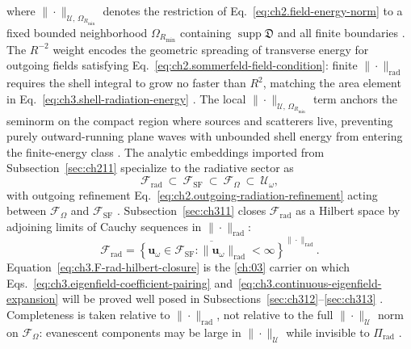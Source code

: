 where \(\|\cdot\|_{\mathcal{U},\,\Omega_{R_{\min}}}\) denotes the restriction of
Eq.~\eqref{eq:ch2.field-energy-norm} to a fixed bounded neighborhood \(\Omega_{R_{\min}}\) containing
\(\operatorname{supp}\mathfrak{D}\) and all finite boundaries \cite{stratton1941}. The
\(R^{-2}\) weight encodes the geometric spreading of transverse energy for outgoing fields satisfying
Eq.~\eqref{eq:ch2.sommerfeld-field-condition}: finite \(\|\cdot\|_{\mathrm{rad}}\) requires the shell
integral to grow no faster than \(R^{2}\), matching the area element in
Eq.~\eqref{eq:ch3.shell-radiation-energy} \cite{stratton1941}. The local
\(\|\cdot\|_{\mathcal{U},\,\Omega_{R_{\min}}}\) term anchors the seminorm on the compact region where
sources and scatterers live, preventing purely outward-running plane waves with unbounded shell energy
from entering the finite-energy class \cite{stratton1941}.
The analytic embeddings imported from Subsection~\ref{sec:ch211} specialize to the radiative sector as
\begin{equation}
\label{eq:ch3.radiative-subspace-chain}
\mathcal{F}_{\mathrm{rad}}
\ \subset\
\mathcal{F}_{\mathrm{SF}}
\ \subset\
\mathcal{F}_\Omega
\ \subset\
\mathcal{U}_\omega,
\end{equation}
with outgoing refinement Eq.~\eqref{eq:ch2.outgoing-radiation-refinement} acting between
\(\mathcal{F}_\Omega\) and \(\mathcal{F}_{\mathrm{SF}}\) \cite{stratton1941}. Subsection~\ref{sec:ch311}
closes \(\mathcal{F}_{\mathrm{rad}}\) as a Hilbert space by adjoining limits of Cauchy sequences in
\(\|\cdot\|_{\mathrm{rad}}\):
\begin{equation}
\label{eq:ch3.F-rad-hilbert-closure}
\mathcal{F}_{\mathrm{rad}}
=
\overline{
\left\{
\mathbf{u}_\omega\in\mathcal{F}_{\mathrm{SF}}:
\|\mathbf{u}_\omega\|_{\mathrm{rad}}<\infty
\right\}
}^{\|\cdot\|_{\mathrm{rad}}}.
\end{equation}
Equation~\eqref{eq:ch3.F-rad-hilbert-closure} is the \ref{ch:03} carrier on which
Eqs.~\eqref{eq:ch3.eigenfield-coefficient-pairing} and~\eqref{eq:ch3.continuous-eigenfield-expansion}
will be proved well posed in Subsections~\ref{sec:ch312}--\ref{sec:ch313} \cite{stratton1941}.
Completeness is taken relative to \(\|\cdot\|_{\mathrm{rad}}\), not relative to the full
\(\|\cdot\|_{\mathcal{U}}\) norm on \(\mathcal{F}_\Omega\): evanescent components may be large in
\(\|\cdot\|_{\mathcal{U}}\) while invisible to \(\Pi_{\mathrm{rad}}\) \cite{harrington2001}.
